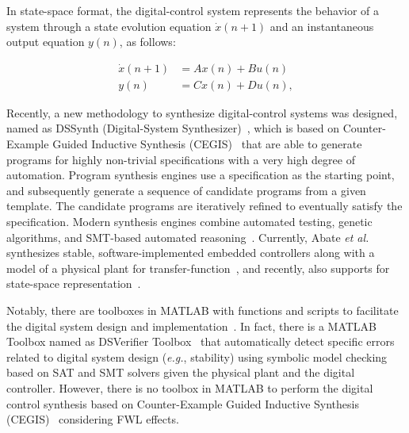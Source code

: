 In state-space format, the digital-control system represents the behavior of a system through a state evolution equation $\dot{x}(n+1)$ and an instantaneous output equation $y(n)$, as follows:

\begin{equation}
\begin{split}
\dot{x}(n+1) &= A x(n) + B u(n)
\\
y(n) &= C x(n) + D u(n), 
\end{split}\label{eq:ss-example}
\end{equation}


Recently, a new methodology to synthesize digital-control systems was designed, named as DSSynth (Digital-System Synthesizer)~\cite{abate2017, abatecav2017}, which is based on Counter-Example Guided Inductive Synthesis (CEGIS)~\cite{DBLP:conf/asplos/Solar-LezamaTBSS06} that are able to generate programs for highly non-trivial specifications with a very high degree of automation. Program synthesis engines use a specification as the starting point, and subsequently generate a sequence of candidate programs from a given template. The candidate programs are iteratively refined to eventually satisfy the specification. Modern synthesis engines combine automated testing, genetic algorithms, and SMT-based automated reasoning~\cite{DBLP:journals/corr/AlurFSS16a, DBLP:conf/lpar/DavidKL15}. Currently, Abate {\it et al.}~\cite{abate2017} synthesizes stable, software-implemented embedded controllers along with a model of a physical plant for transfer-function~\cite{abate2017}, and recently, also supports for state-space representation~\cite{abatecav2017}.

Notably, there are toolboxes in MATLAB with functions and scripts to facilitate the digital system design and implementation~\cite{matlab-toolbox}. In fact, there is a MATLAB Toolbox named as DSVerifier Toolbox~\cite{issta2017} that automatically detect specific errors related to digital system design ({\it e.g.}, stability) using symbolic model checking based on SAT and SMT solvers given the physical plant and the digital controller. However, there is no toolbox in MATLAB to perform the digital control synthesis based on Counter-Example Guided Inductive Synthesis (CEGIS)~\cite{DBLP:conf/asplos/Solar-LezamaTBSS06} considering FWL effects.

